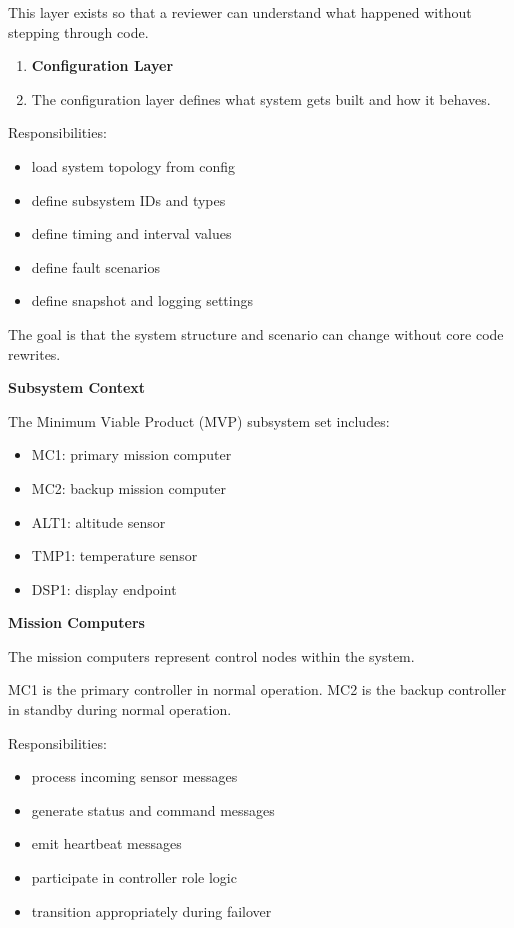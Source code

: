 \documentclass[12pt]{article}
\begin{document}
This layer exists so that a reviewer can understand what happened without stepping through code.
\begin{enumerate}[start=5]
    \item \textbf{Configuration Layer}
    \item[] The configuration layer defines what system gets built and how it behaves.
\end{enumerate}

Responsibilities:
\begin{itemize}[leftmargin=*]
    \item load system topology from config
    \item define subsystem IDs and types
    \item define timing and interval values
    \item define fault scenarios
    \item define snapshot and logging settings
\end{itemize}

The goal is that the system structure and scenario can change without core code rewrites.

\textbf{Subsystem Context}

The Minimum Viable Product (MVP) subsystem set includes:
\begin{itemize}[leftmargin=*]
    \item MC1: primary mission computer
    \item MC2: backup mission computer
    \item ALT1: altitude sensor
    \item TMP1: temperature sensor
    \item DSP1: display endpoint
\end{itemize}

\textbf{Mission Computers}

The mission computers represent control nodes within the system.

MC1 is the primary controller in normal operation.
MC2 is the backup controller in standby during normal operation.


Responsibilities:
\begin{itemize}[leftmargin=*]
    \item process incoming sensor messages
    \item generate status and command messages
    \item emit heartbeat messages
    \item participate in controller role logic
    \item transition appropriately during failover
\end{itemize}
\end{document}
